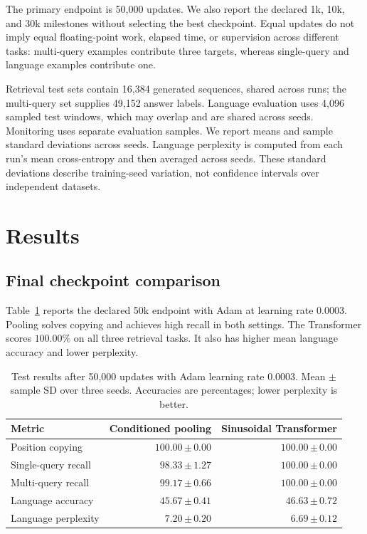 \documentclass[11pt]{article}
\newcommand{\sd}[2]{#1\,{\scriptstyle\pm\,#2}}
\begin{document}
The primary endpoint is 50,000 updates. We also report the declared 1k, 10k, and 30k milestones without selecting the best checkpoint. Equal updates do not imply equal floating-point work, elapsed time, or supervision across different tasks: multi-query examples contribute three targets, whereas single-query and language examples contribute one.

Retrieval test sets contain 16,384 generated sequences, shared across runs; the multi-query set supplies 49,152 answer labels. Language evaluation uses 4,096 sampled test windows, which may overlap and are shared across seeds. Monitoring uses separate evaluation samples. We report means and sample standard deviations across seeds. Language perplexity is computed from each run's mean cross-entropy and then averaged across seeds. These standard deviations describe training-seed variation, not confidence intervals over independent datasets.

\section{Results}
\subsection{Final checkpoint comparison}
Table~\ref{tab:main} reports the declared 50k endpoint with Adam at learning rate 0.0003. Pooling solves copying and achieves high recall in both settings. The Transformer scores $100.00\%$ on all three retrieval tasks. It also has higher mean language accuracy and lower perplexity.

\begin{table}[htbp]
\centering
\caption{Test results after 50,000 updates with Adam learning rate 0.0003. Mean $\pm$ sample SD over three seeds. Accuracies are percentages; lower perplexity is better.}
\label{tab:main}
\begin{tabular}{lrr}
\toprule
Metric & Conditioned pooling & Sinusoidal Transformer\\
\midrule
Position copying & $\sd{100.00}{0.00}$ & $\sd{100.00}{0.00}$\\
Single-query recall & $\sd{98.33}{1.27}$ & $\sd{100.00}{0.00}$\\
Multi-query recall & $\sd{99.17}{0.66}$ & $\sd{100.00}{0.00}$\\
Language accuracy & $\sd{45.67}{0.41}$ & $\sd{46.63}{0.72}$\\
Language perplexity & $\sd{7.20}{0.20}$ & $\sd{6.69}{0.12}$\\
\bottomrule
\end{tabular}
\end{table}
\end{document}
